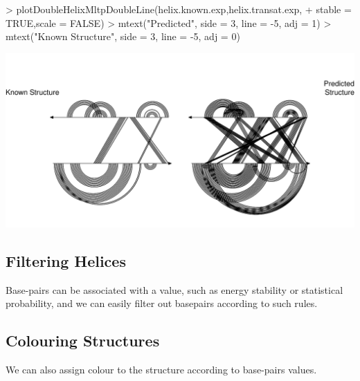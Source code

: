 \documentclass[letterpaper]{article}
\begin{document}
\begin{Schunk}
\begin{Sinput}
> plotDoubleHelixMltpDoubleLine(helix.known.exp,helix.transat.exp,
+                               stable = TRUE,scale = FALSE)
> mtext("Predicted\nStructure", side = 3, line = -5, adj = 1)
> mtext("Known Structure", side = 3, line = -5, adj = 0)
\end{Sinput}
\end{Schunk}
\includegraphics{R4RNA-008}


\subsection{Filtering Helices}
Base-pairs can be associated with a value, such as energy stability or
statistical probability, and we can easily filter out basepairs according to
such rules.

\begin{Schunk}
\end{Schunk}

\subsection{Colouring Structures}
We can also assign colour to the structure according to base-pairs values.
\end{document}
